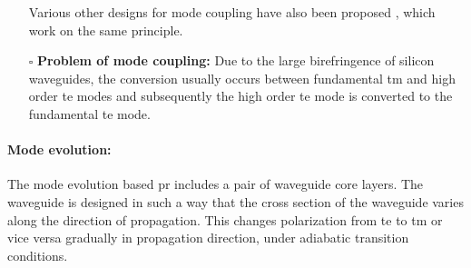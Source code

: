 \documentclass[../report.tex]{subfiles}
\begin{document}
\begin{itemize}[leftmargin=*]
	Various other designs for mode coupling have also been proposed \cite{wang_design_2014,ding_Integrated_2013}, which work on the same principle.
	
	\item[$\square$] \textbf{Problem of mode coupling:} Due to the large birefringence of silicon waveguides, the conversion usually occurs between fundamental \gls{tm} and high order \gls{te} modes and subsequently the high order \gls{te} mode is converted to the fundamental \gls{te} mode.
\end{itemize}		
			\paragraph*{Mode evolution:}
The mode evolution based \gls{pr} includes a pair of waveguide core layers. The waveguide is designed in such a way that the cross section of the waveguide varies along the direction of propagation. This changes polarization from \gls{te} to \gls{tm} or vice versa gradually in propagation direction, under adiabatic transition conditions.
\end{document}
